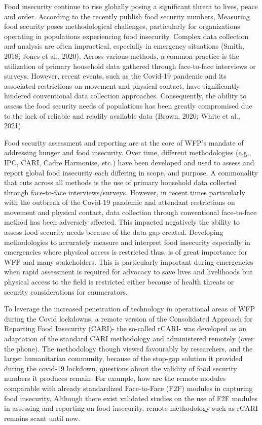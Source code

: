\documentclass[11pt,harvard]{article}
\begin{document}
Food insecurity continue to rise globally posing a significant threat to lives, peace and order. According to the recently publish food security numbers,  Measuring food security poses methodological challenges, particularly for organizations operating in populations experiencing food insecurity. Complex data collection and analysis are often impractical, especially in emergency situations (Smith, 2018; Jones et al., 2020). Across various methods, a common practice is the utilization of primary household data gathered through face-to-face interviews or surveys. However, recent events, such as the Covid-19 pandemic and its associated restrictions on movement and physical contact, have significantly hindered conventional data collection approaches. Consequently, the ability to assess the food security needs of populations has been greatly compromised due to the lack of reliable and readily available data (Brown, 2020; White et al., 2021).



Food security assessment and reporting are at the core of WFP’s mandate of addressing hunger and food insecurity. Over time, different methodologies (e.g., IPC, CARI, Cadre Harmonise, etc.) have been developed and used to assess and report global food insecurity each differing in scope, and purpose. A commonality that cuts across all methods is the use of primary household data collected through face-to-face interviews/surveys. However, in recent times particularly with the outbreak of the Covid-19 pandemic and attendant restrictions on movement and physical contact, data collection through conventional face-to-face method has been adversely affected. This impacted negatively the ability to assess food security needs because of the data gap created. Developing methodologies to accurately measure and interpret food insecurity especially in emergencies where physical access is restricted thus, is of great importance for WFP and many stakeholders. This is particularly important during emergencies when rapid assessment is required for advocacy to save lives and livelihoods but physical access to the field is restricted either because of health threats or security considerations for enumerators. 

To leverage the increased penetration of technology in operational areas of WFP during the Covid lockdowns, a remote version of the Consolidated Approach for Reporting Food Insecurity (CARI)- the so-called rCARI- was developed as an adaptation of the standard CARI methodology and administered remotely (over the phone). The methodology though viewed favourably by researchers, and the larger humanitarian community, because of the stop-gap solution it provided during the covid-19 lockdown, questions about the validity of food security numbers it produces remain. For example, how are the remote modules comparable with already standardized Face-to-Face (F2F) modules in capturing food insecurity. Although there exist validated studies on the use of F2F modules in assessing and reporting on food insecurity, remote methodology such as rCARI remains scant until now. 
\end{document}
